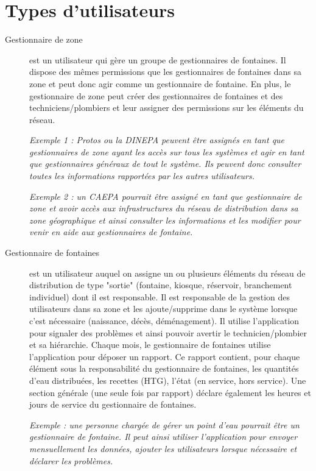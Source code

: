 \documentclass[a4paper, 11pt]{article}
\begin{document}
\section{Types d'utilisateurs}
  \begin{description}
    \item[Gestionnaire de zone] est un utilisateur qui gère un groupe de gestionnaires de fontaines. Il dispose des mêmes permissions que les gestionnaires de fontaines dans sa zone et peut donc agir comme un gestionnaire de fontaine. En plus, le gestionnaire de zone peut créer des gestionnaires de fontaines et des techniciens/plombiers et leur assigner des permissions sur les éléments du réseau.

    \emph{Exemple 1 : Protos ou la DINEPA peuvent être assignés en tant que gestionnaires de zone ayant les accès sur tous les systèmes et agir en tant que gestionnaires généraux de tout le système. Ils peuvent donc consulter toutes les informations rapportées par les autres utilisateurs.}

    \emph{Exemple 2 : un CAEPA pourrait être assigné en tant que gestionnaire de zone et avoir accès aux infrastructures du réseau de distribution dans sa zone géographique et ainsi consulter les informations et les modifier pour venir en aide aux gestionnaires de fontaine.}

    \item[Gestionnaire de fontaines] est un utilisateur auquel on assigne un ou plusieurs éléments du réseau de distribution de type "sortie" (fontaine, kiosque, réservoir, branchement individuel) dont il est responsable.
    Il est responsable de la gestion des utilisateurs dans sa zone et les ajoute/supprime dans le système lorsque c'est nécessaire (naissance, décès, déménagement).
    Il utilise l'application pour signaler des problèmes et ainsi pouvoir avertir le technicien/plombier et sa hiérarchie. Chaque mois, le gestionnaire de fontaines utilise l'application pour déposer un rapport. Ce rapport contient, pour chaque élément sous la responsabilité du gestionnaire de fontaines, les quantités d'eau distribuées, les recettes (HTG), l'état (en service, hors service). Une section générale (une seule fois par rapport) déclare également les heures et jours de service du gestionnaire de fontaines.

    \emph{Exemple : une personne chargée de gérer un point d'eau pourrait être un gestionnaire de fontaine. Il peut ainsi utiliser l'application pour envoyer mensuellement les données, ajouter les utilisateurs lorsque nécessaire et déclarer les problèmes.}


\end{description}
\end{document}
